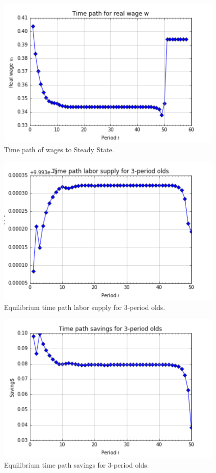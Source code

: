\documentclass[letterpaper,12pt]{article}
\theoremstyle{definition}
\begin{document}
	\begin{figure}[h!]
	\centering
	\includegraphics[scale=.8]{code/images/wpath}
	\caption{Time path of wages to Steady State.}
	\end{figure}
	
	\begin{figure}[h!]
	\centering
	\includegraphics[scale=.8]{code/images/tpi_n}
	\caption{Equilibrium time path labor supply for 3-period olds.}
	\end{figure}
	
	\begin{figure}[h!]
	\centering
	\includegraphics[scale=.8]{code/images/tpi_s}
	\caption{Equilibrium time path savings for 3-period olds.}
	\end{figure}
\end{document}
